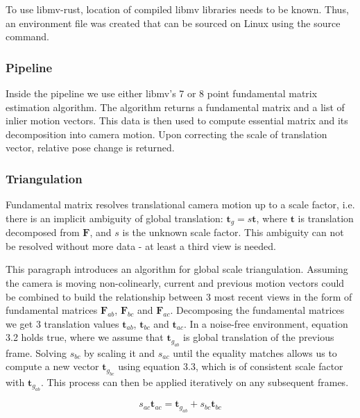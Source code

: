 \documentclass[11pt,english]{report}
\begin{document}
To use libmv-rust, location of compiled libmv libraries needs to be known. Thus, an environment file was created that can be sourced on Linux using the source command.

\subsubsection{Pipeline}

Inside the pipeline we use either libmv's 7 or 8 point fundamental matrix estimation algorithm. The algorithm returns a fundamental matrix and a list of inlier motion vectors. This data is then used to compute essential matrix and its decomposition into camera motion. Upon correcting the scale of translation vector, relative pose change is returned.

\subsubsection{Triangulation}

Fundamental matrix resolves translational camera motion up to a scale factor, i.e. there is an implicit ambiguity\cite{hartley_zisserman_2004} of global translation: $\mathbf{t}_g = s\mathbf{t}$, where $\mathbf{t}$ is translation decomposed from $\mathbf{F}$, and $s$ is the unknown scale factor. This ambiguity can not be resolved without more data - at least a third view is needed.

This paragraph introduces an algorithm for global scale triangulation. Assuming the camera is moving non-colinearly, current and previous motion vectors could be combined to build the relationship between 3 most recent views in the form of fundamental matrices $\mathbf{F}_{ab}$, $\mathbf{F}_{bc}$ and $\mathbf{F}_{ac}$. Decomposing the fundamental matrices we get 3 translation values $\mathbf{t}_{ab}$, $\mathbf{t}_{bc}$ and $\mathbf{t}_{ac}$. In a noise-free environment, equation 3.2 holds true, where we assume that $\mathbf{t}_{g_{ab}}$ is global translation of the previous frame. Solving $s_{bc}$ by scaling it and $s_{ac}$ until the equality matches allows us to compute a new vector $\mathbf{t}_{g_{bc}}$ using equation 3.3, which is of consistent scale factor with $\mathbf{t}_{g_{ab}}$. This process can then be applied iteratively on any subsequent frames.

\begin{equation}
	s_{ac}\mathbf{t}_{ac} = \mathbf{t}_{g_{ab}} + s_{bc}\mathbf{t}_{bc}
\end{equation}
\end{document}
